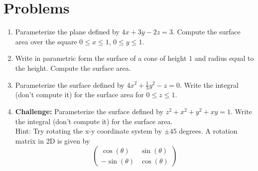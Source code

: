 \documentclass[letterpaper,11pt]{article}
\begin{document}
\section*{Problems}
\begin{enumerate}
\item Parameterize the plane defined by $4 x + 3 y - 2 z = 3$.
  Compute the surface area over the square $0 \leq x \leq 1$, $0 \leq y \leq 1$.
  \newline
  \newline
  \newline
  \newline
  \newline
  \newline
  \newline
  \newline
  \newline
\item Write in parametric form the surface of a cone of height $1$ and radius equal to the height.
  Compute the surface area.
  \newpage
\item Parameterize the surface defined by $4 x^2 + \frac{1}{3} y^2 - z = 0$.
  Write the integral (don't compute it) for the surface area for $0 \leq z \leq 1$.
  \newline
  \newline
  \newline
  \newline
  \newline
  \newline
  \newline
  \newline
  \newline
  \newline
  \newline
  \newline
  \newline
  \newline
  \newline
  \newline
  \newline
  \newline
  \newline
\item {\bf Challenge:} Parameterize the surface defined by $z^2 + x^2 + y^2 + x y = 1$.
  Write the integral (don't compute it) for the surface area.\\
  Hint: Try rotating the x-y coordinate system by $\pm 45$ degrees.
  A rotation matrix in 2D is given by
  $$
  \begin{pmatrix}
    \cos(\theta) & \sin(\theta)\\
    -\sin(\theta) & \cos(\theta)
  \end{pmatrix}
  $$
  \newpage
\end{enumerate}
\end{document}
